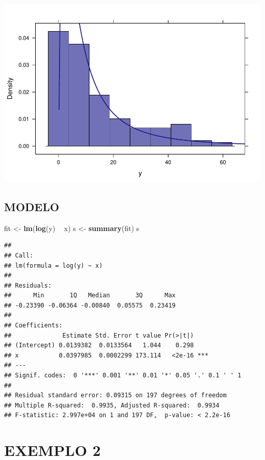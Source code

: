 \documentclass[]{article}
\newenvironment{Shaded}{\begin{snugshade}}{\end{snugshade}}
\newcommand{\KeywordTok}[1]{\textcolor[rgb]{0.13,0.29,0.53}{\textbf{#1}}}
\newcommand{\StringTok}[1]{\textcolor[rgb]{0.31,0.60,0.02}{#1}}
\newcommand{\OperatorTok}[1]{\textcolor[rgb]{0.81,0.36,0.00}{\textbf{#1}}}
\newcommand{\NormalTok}[1]{#1}
\begin{document}
\includegraphics{Impacto_sigma_files/figure-latex/unnamed-chunk-4-1.pdf}

\subsection{MODELO}\label{modelo}

\begin{Shaded}
\begin{Highlighting}[]
\NormalTok{fit <-}\StringTok{ }\KeywordTok{lm}\NormalTok{(}\KeywordTok{log}\NormalTok{(y) }\OperatorTok{~}\StringTok{ }\NormalTok{x)}
\NormalTok{s <-}\StringTok{ }\KeywordTok{summary}\NormalTok{(fit)}
\NormalTok{s}
\end{Highlighting}
\end{Shaded}

\begin{verbatim}
## 
## Call:
## lm(formula = log(y) ~ x)
## 
## Residuals:
##      Min       1Q   Median       3Q      Max 
## -0.23390 -0.06364 -0.00840  0.05575  0.23419 
## 
## Coefficients:
##              Estimate Std. Error t value Pr(>|t|)    
## (Intercept) 0.0139382  0.0133564   1.044    0.298    
## x           0.0397985  0.0002299 173.114   <2e-16 ***
## ---
## Signif. codes:  0 '***' 0.001 '**' 0.01 '*' 0.05 '.' 0.1 ' ' 1
## 
## Residual standard error: 0.09315 on 197 degrees of freedom
## Multiple R-squared:  0.9935, Adjusted R-squared:  0.9934 
## F-statistic: 2.997e+04 on 1 and 197 DF,  p-value: < 2.2e-16
\end{verbatim}

\section{EXEMPLO 2}\label{exemplo-2}
\end{document}
